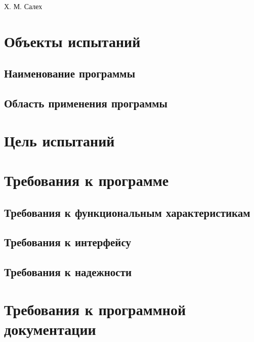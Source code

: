 \documentclass[a4paper,12pt]{article}
\begin{document}
	
	
	

	{Х. М. Салех}
	
	\firstPage
	\newpage
	\secondPage
	\newpage
	\thirdPage
	\newpage
	
	\section{Объекты испытаний}
	\subsection{Наименование программы}
	\subsection{Область применения программы}
	
					\newpage
	\section{Цель испытаний}
	
					\newpage 
	\section{Требования к программе}
	\subsection{Требования к функциональным характеристикам}
	\subsection{Требования к интерфейсу}
	\subsection{Требования к надежности}
	
						\newpage
	\section{Требования к программной документации}
\end{document}
